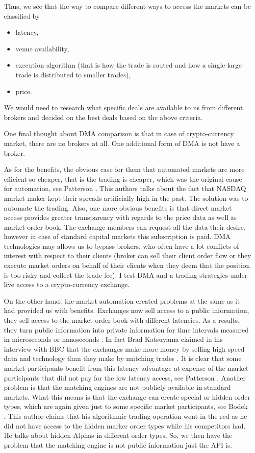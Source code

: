 \documentclass[12pt]{article}
\begin{document}
Thus, we see that the way to compare different ways to access the markets can be classified by
\begin{itemize}
\item latency,
\item venue availability,
\item execution algorithm (that is how the trade is routed and how a single large trade is distributed to smaller trades),
\item price.
\end{itemize}
We would need to research what specific deals are available to us from different brokers and decided on the best deals based on the above criteria.

One final thought about DMA comparison is that in case of crypto-currency market, there are no brokers at all. One additional form of DMA is not have a broker.

As for the benefits, the obvious case for them that automated markets are more efficient so cheaper, that is the trading is cheaper, which was the original cause for automation, see Patterson \cite{patterson}. This authors talks about the fact that NASDAQ market maker kept their spreads artificially high in the past. The solution was to automate the trading. Also, one more obvious benefits is that direct market access provides greater transparency with regards to the price data as well as market order book. The exchange members can request all the data their desire, however in case of standard capital markets this subscription is paid. DMA technologies may allows us to bypass brokers, who often have a lot conflicts of interest with respect to their clients (broker can sell their client order flow or they execute market orders on behalf of their clients when they deem that the position is too risky and collect the trade fee). I test DMA and a trading strategies under live access to a crypto-currency exchange.

On the other hand, the market automation created problems at the same as it had provided us with benefits. Exchanges now sell access to a public information, they sell access to the market order book with different latencies. As a results, they turn public information into private information for time intervals measured in microseconds or nanoseconds \cite{ohara}. In fact Brad Katsuyama claimed in his interview with BBC that the exchanges make more money by selling high speed data and technology than they make by matching trades . It is clear that some market participants benefit from this latency advantage at expense of the market participants that did not pay for the low latency access, see Patterson \cite{patterson}. Another problem is that the matching engines are not publicly available in standard markets. What this means is that the exchange can create special or hidden order types, which are again given just to some specific market participants, see Bodek \cite{bodek}. This author claims that his algorithmic trading operation went in the red as he did not have access to the hidden marker order types while his competitors had. He talks about hidden Alphas in different order types. So, we then have the problem that the matching engine is not public information just the API is.
\end{document}
